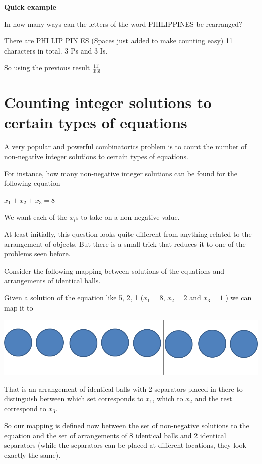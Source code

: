 \documentclass[12pt]{article}
\begin{document}
\textbf{Quick example}

In how many ways can the letters of the word PHILIPPINES be rearranged?

There are PHI LIP PIN ES (Spaces just added to make counting easy) 11 characters in total. 3 Ps and 3 Is. 

So using the previous result $\frac{11!}{3!3!}$

\section*{Counting integer solutions to certain types of equations}

A very popular and powerful combinatorics problem is to count the number of non-negative integer solutions to certain types of equations.

For instance, how many non-negative integer solutions can be found for the following equation

$x_1 + x_2 + x_3 = 8$

We want each of the $x_i$s to take on a non-negative value. 

At least initially, this question looks quite different from anything related to the arrangement of objects. But there is a small trick that reduces it to one of the problems seen before.

Consider the following mapping between solutions of the equations and arrangements of identical balls.

Given a solution of the equation like 5, 2, 1 ($x_1 = 8$, $x_2 = 2$ and $x_3 = 1$ ) we can map it to

\includegraphics[scale=0.5]{Separators.png}

That is an arrangement of identical balls with 2 separators placed in there to distinguish between which set corresponds to $x_1$, which to $x_2$ and the rest correspond to $x_3$.

So our mapping is defined now between the set of non-negative solutions to the equation and the set of arrangements of 8 identical balls and 2 identical separators (while the separators can be placed at different locations, they look exactly the same).
\end{document}
